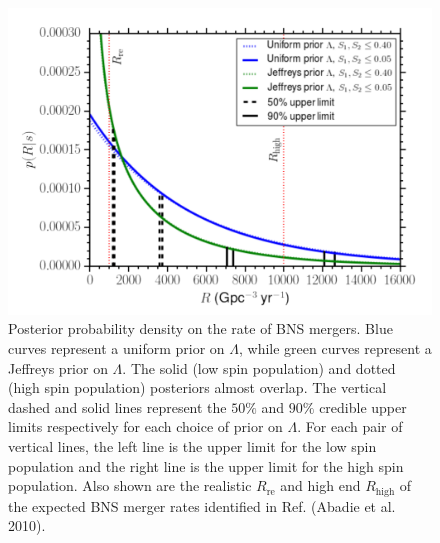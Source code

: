 \begin{figure}
  \includegraphics[width=\linewidth]{figs/chapter4/bns_upper_limits_posterior_rates.png}
  \caption{Posterior probability density on the rate of BNS mergers. Blue curves represent a uniform prior on $\Lambda$, while green curves represent a Jeffreys prior on $\Lambda$. The solid (low spin population) and dotted (high spin population) posteriors almost overlap. The vertical dashed and solid lines represent the $50\%$ and $90\%$ credible upper limits respectively for each choice of prior on $\Lambda$. For each pair of vertical lines, the left line is the upper limit for the low spin population and the right line is the upper limit for the high spin population. Also
  shown are the realistic $R_\mathrm{re}$ and high end $R_\mathrm{high}$ of the expected BNS merger rates identified in Ref. (Abadie et al. 2010).}
  \label{fig:bns_upper_limits}
\end{figure}

